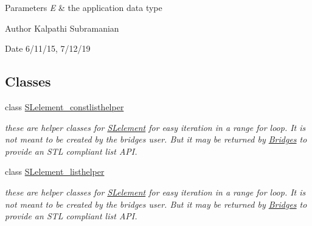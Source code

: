 \begin{DoxyParams}{Parameters}
{\em E} & the application data type\\
\hline
\end{DoxyParams}
\begin{DoxyAuthor}{Author}
Kalpathi Subramanian 
\end{DoxyAuthor}
\begin{DoxyDate}{Date}
6/11/15, 7/12/19 
\end{DoxyDate}
\subsection*{Classes}
\begin{DoxyCompactItemize}
\item 
class \hyperlink{classbridges_1_1datastructure_1_1_s_lelement_1_1_s_lelement__constlisthelper}{S\+Lelement\+\_\+constlisthelper}
\begin{DoxyCompactList}\small\item\em these are helper classes for \hyperlink{classbridges_1_1datastructure_1_1_s_lelement}{S\+Lelement} for easy iteration in a range for loop. It is not meant to be created by the bridges user. But it may be returned by \hyperlink{classbridges_1_1_bridges}{Bridges} to provide an S\+TL compliant list A\+PI. \end{DoxyCompactList}\item 
class \hyperlink{classbridges_1_1datastructure_1_1_s_lelement_1_1_s_lelement__listhelper}{S\+Lelement\+\_\+listhelper}
\begin{DoxyCompactList}\small\item\em these are helper classes for \hyperlink{classbridges_1_1datastructure_1_1_s_lelement}{S\+Lelement} for easy iteration in a range for loop. It is not meant to be created by the bridges user. But it may be returned by \hyperlink{classbridges_1_1_bridges}{Bridges} to provide an S\+TL compliant list A\+PI. \end{DoxyCompactList}\end{DoxyCompactItemize}
